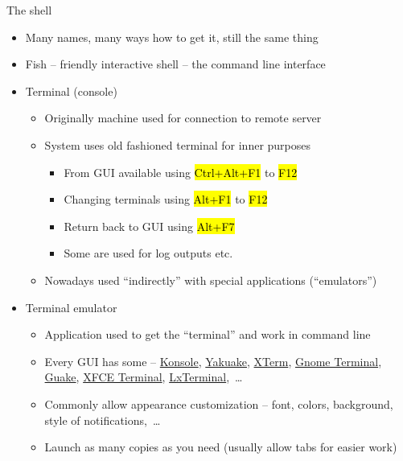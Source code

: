 \documentclass[compress, ucs, xelatex, 11pt, xcolor=svgnames,
  hyperref={
    bookmarks=true,
    unicode=true,
    colorlinks=true,
    pdftitle={Linux, command line and MetaCentrum},
    plainpages=false,
    pdfauthor={Vojtech Zeisek},
    pdfsubject={Course about use of Linux command line, writing shell scripts and using MetaCentrum of CESNET},
    pdfcreator={XeLaTeX},
    pdfkeywords={Linux, GNU, BASH, shell, command line, MetaCentrum},
    linkcolor=DarkRed,
    anchorcolor=DarkBlue,
    citecolor=Indigo,
    filecolor=NavyBlue,
    menucolor=DarkMagenta,
    urlcolor=DarkBlue,
    pdftex},
  url={hyphens, lowtilde} %
  ]{beamer}
\renewcommand{\texttt}[1]{\hl{\ttfamily #1}}
\begin{document}
\begin{frame}{The shell}
  \begin{itemize}
    \item Many names, many ways how to get it, still the same thing
    \item Fish -- friendly interactive shell -- the command line interface
    \item Terminal (console)
    \begin{itemize}
      \item Originally machine used for connection to remote server
      \item System uses old fashioned terminal for inner purposes
      \begin{itemize}
	\item From GUI available using \texttt{Ctrl+Alt+F1} to \texttt{F12}
	\item Changing terminals using \texttt{Alt+F1} to \texttt{F12}
	\item Return back to GUI using \texttt{Alt+F7}
	\item Some are used for log outputs etc.
      \end{itemize}
      \item Nowadays used ``indirectly'' with special applications (``emulators'')
    \end{itemize}
    \item Terminal emulator
    \begin{itemize}
      \item Application used to get the ``terminal'' and work in command line
      \item Every GUI has some -- \href{https://konsole.kde.org/}{Konsole}, \href{https://yakuake.kde.org/}{Yakuake}, \href{http://invisible-island.net/xterm/}{XTerm}, \href{https://wiki.gnome.org/Apps/Terminal}{Gnome Terminal}, \href{http://guake.org/}{Guake}, \href{http://docs.xfce.org/apps/terminal/start}{XFCE Terminal}, \href{https://wiki.lxde.org/en/LXTerminal}{LxTerminal},~\ldots
      \item Commonly allow appearance customization -- font, colors, background, style of notifications,~\ldots
      \item Launch as many copies as you need (usually allow tabs for easier work)
    \end{itemize}
  \end{itemize}
\end{frame}
\end{document}
